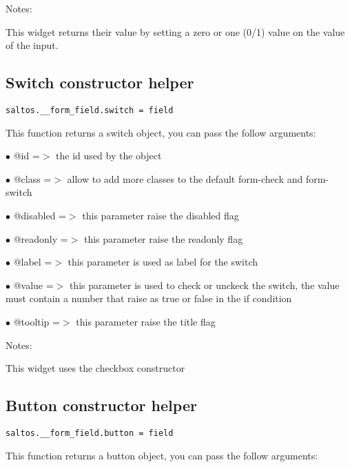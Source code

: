 \documentclass[a4paper]{book}
\begin{document}
Notes:

This widget returns their value by setting a zero or one (0/1) value on the value of the input.

\hypertarget{toc389}{}
\subsection{Switch constructor helper}

\begin{lstlisting}
saltos.__form_field.switch = field
\end{lstlisting}

This function returns a switch object, you can pass the follow arguments:

\begin{compactitem}
\item[\color{myblue}$\bullet$] @id       =$>$ the id used by the object
\item[\color{myblue}$\bullet$] @class    =$>$ allow to add more classes to the default form-check and form-switch
\item[\color{myblue}$\bullet$] @disabled =$>$ this parameter raise the disabled flag
\item[\color{myblue}$\bullet$] @readonly =$>$ this parameter raise the readonly flag
\item[\color{myblue}$\bullet$] @label    =$>$ this parameter is used as label for the switch
\item[\color{myblue}$\bullet$] @value    =$>$ this parameter is used to check or unckeck the switch, the value
             must contain a number that raise as true or false in the if condition
\item[\color{myblue}$\bullet$] @tooltip  =$>$ this parameter raise the title flag
\end{compactitem}

Notes:

This widget uses the checkbox constructor

\hypertarget{toc390}{}
\subsection{Button constructor helper}

\begin{lstlisting}
saltos.__form_field.button = field
\end{lstlisting}

This function returns a button object, you can pass the follow arguments:
\end{document}
